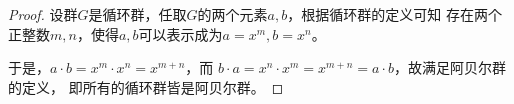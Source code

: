 \begin{proof}
   设群$G$是循环群，任取$G$的两个元素$a,b$，根据循环群的定义可知
   存在两个正整数$m,n$，使得$a,b$可以表示成为$a=x^m,b=x^n$。

   于是，$a\cdot b = x^m\cdot x^n=x^{m+n}$，而
   $b\cdot a = x^n\cdot x^m=x^{m+n} = a\cdot b$，故满足阿贝尔群的定义，
   即所有的循环群皆是阿贝尔群。
\end{proof}